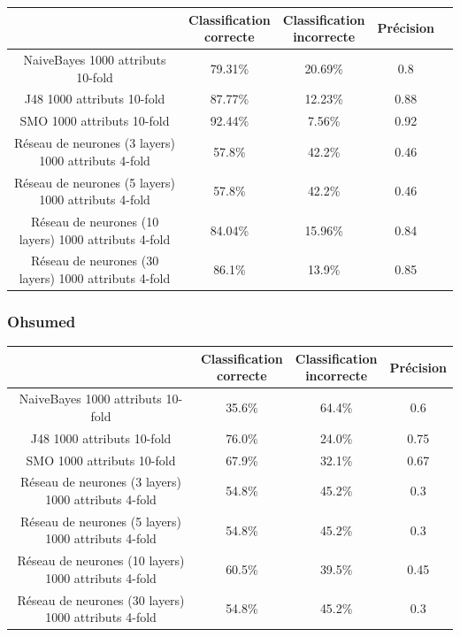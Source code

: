 \documentclass[a4paper,10pt]{article}
\begin{document}
\begin{center}
\begin{tabular}{ |c|c|c|c|c| } 
 \hline
  & \pbox{20cm}{Classification \\ correcte} &  \pbox{20cm}{Classification \\ incorrecte} & Précision \\ 
 \hline
 NaiveBayes 1000 attributs 10-fold  & 79.31\% & 20.69\% & 0.8\\ 
 J48 1000 attributs 10-fold  & 87.77\% & 12.23\% & 0.88\\ 
 SMO 1000 attributs 10-fold  & 92.44\% & 7.56\% & 0.92\\ 
 Réseau de neurones (3 layers) 1000 attributs 4-fold  & 57.8\% & 42.2\% & 0.46 \\ 
 Réseau de neurones (5 layers) 1000 attributs 4-fold  & 57.8\% & 42.2\% & 0.46\\ 
 Réseau de neurones (10 layers) 1000 attributs 4-fold  & 84.04\% & 15.96\% & 0.84\\ 
 Réseau de neurones (30 layers) 1000 attributs 4-fold  & 86.1\% & 13.9\% & 0.85\\  
 \hline
\end{tabular}
\end{center}

\subsubsection{Ohsumed}

\begin{center}
\begin{tabular}{ |c|c|c|c| } 
 \hline
  & \pbox{20cm}{Classification \\ correcte} &  \pbox{20cm}{Classification \\ incorrecte} & Précision \\ 
 \hline
 NaiveBayes 1000 attributs 10-fold  & 35.6\% & 64.4\% & 0.6 \\ 
 J48 1000 attributs 10-fold  & 76.0\% & 24.0\% & 0.75 \\ 
 SMO 1000 attributs 10-fold  & 67.9\% & 32.1\% & 0.67 \\ 
 Réseau de neurones (3 layers) 1000 attributs 4-fold  & 54.8\% & 45.2\% & 0.3 \\ 
 Réseau de neurones (5 layers) 1000 attributs 4-fold  & 54.8\% & 45.2\% & 0.3 \\ 
 Réseau de neurones (10 layers) 1000 attributs 4-fold  & 60.5\% & 39.5\% & 0.45 \\ 
 Réseau de neurones (30 layers) 1000 attributs 4-fold  & 54.8\% & 45.2\% & 0.3 \\  
 \hline
\end{tabular}
\end{center}
\end{document}

